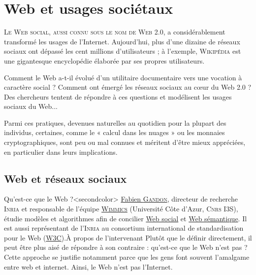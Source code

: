 \chapter[Web et usages sociétaux]{Web et usages sociétaux}
\label{chap:II}

\lettrine{L}{e Web social, aussi connu sous le nom de Web 2.0}, a considérablement transformé les usages de l'Internet. Aujourd'hui, plus d'une dizaine de réseaux sociaux ont dépassé les cent millions d'utilisateurs ; à l'exemple, \textsc{Wikipédia} est une gigantesque encyclopédie élaborée par ses propres utilisateurs. 

Comment le Web a-t-il évolué d'un utilitaire documentaire vers une vocation à caractère social ? Comment ont émergé les réseaux sociaux au cœur du Web 2.0 ? Des chercheurs tentent de répondre à ces questions et modélisent les usages sociaux du Web...

Parmi ces pratiques, devenues naturelles au quotidien pour la plupart des individus, certaines, comme le « calcul dans les nuages » ou les monnaies cryptographiques, sont peu ou mal connues et méritent d'être mieux appréciées, en particulier dans leurs implications.
\parnotes
\vspace*{2.5\baselineskip}


\section[Web et réseaux sociaux]{Web et réseaux sociaux}
\label{sec:II.1}

Qu'est-ce que le Web ?\caution[t]<secondcolor>{%
\href{http://www-sop.inria.fr/members/Fabien.Gandon/}{Fabien \textsc{Gandon}}, directeur de recherche \textsc{Inria} et responsable de l'équipe \href{https://www.inria.fr/fr/liste-des-equipes-projets}{\textsc{Wimmics}} (Université Côte d’Azur, \textsc{Cnrs} I3S), étudie modèles et algorithmes afin de concilier \href{https://fr.wikipedia.org/wiki/Web_social}{Web social} et \href{https://fr.wikipedia.org/wiki/Web_s\%C3\%A9mantique}{Web sémantique}. Il est aussi représentant de l'\textsc{Inria} au consortium international de standardisation pour le Web (\href{https://www.w3.org/}{W3C}).}{À propos de l'intervenant}
Plutôt que le définir directement, il peut être plus aisé de répondre à son contraire : qu'est-ce que le Web n'est pas ? Cette approche se justifie notamment parce que les gens font souvent l'amalgame entre \gls{web} et \gls{internet}. Ainsi, le Web n'est pas l'Internet. 

